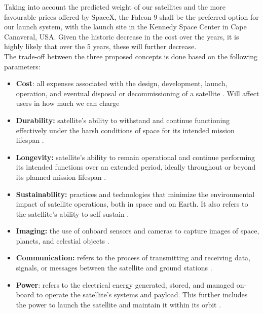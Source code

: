 Taking into account the predicted weight of our satellites and the more favourable prices offered by SpaceX, the Falcon 9 shall be the preferred option for our launch system, with the launch site in the Kennedy Space Center in Cape Canaveral, USA. Given the historic decrease in the cost over the years, it is highly likely that over the 5 years, these will further decrease. \\
\vspace{2mm}
The trade-off between the three proposed concepts is done based on the following parameters:
\begin{itemize}
    \item \textbf{Cost}: all expenses associated with the design, development, launch, operation, and eventual disposal or decommissioning of a satellite \cite{CostEstimate}. Will affect users in how much we can charge
    \item \textbf{Durability:} satellite’s ability to withstand and continue functioning effectively under the harsh conditions of space for its intended mission lifespan \cite{DurabilityDef}.
    \item \textbf{Longevity:} satellite’s ability to remain operational and continue performing its intended functions over an extended period, ideally throughout or beyond its planned mission lifespan \cite{diebold2020longevity}.
    \item \textbf{Sustainability:} practices and technologies that minimize the environmental impact of satellite operations, both in space and on Earth. It also refers to the satellite's ability to self-sustain \cite{white2021sustainability}. 
    \item \textbf{Imaging:} the use of onboard sensors and cameras to capture images of space, planets, and celestial objects \cite{rees2013imaging}.
    \item \textbf{Communication:} refers to the process of transmitting and receiving data, signals, or messages between the satellite and ground stations \cite{Maral2011Communication}.
    \item \textbf{Power}: refers to the electrical energy generated, stored, and managed on-board to operate the satellite’s systems and payload. This further includes the power to launch the satellite and maintain it within its orbit \cite{Elbert2008Power}. 
\end{itemize}


